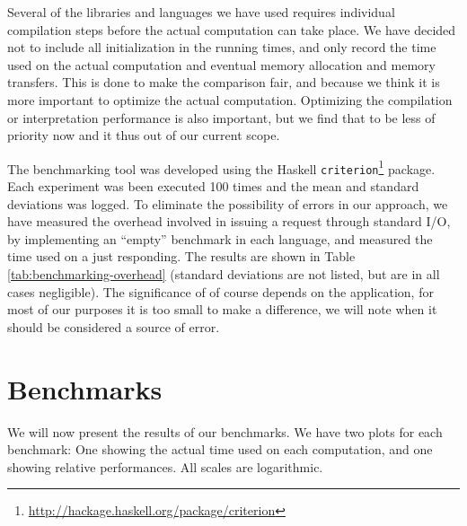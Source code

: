 Several of the libraries and languages we have used requires
individual compilation steps before the actual computation can take
place. We have decided not to include all initialization in the
running times, and only record the time used on the actual computation
and eventual memory allocation and memory transfers. This is done to make the
comparison fair, and because we think it is more important to optimize
the actual computation. Optimizing the compilation or interpretation
performance is also important, but we find that to be less of priority
now and it thus out of our current scope.

The benchmarking tool was developed using the Haskell
\lstinline{criterion}\footnote{\url{http://hackage.haskell.org/package/criterion}}
package. Each experiment was been executed 100 times and the mean and
standard deviations was logged. To eliminate the possibility of errors
in our approach, we have measured the overhead involved in issuing a
request through standard I/O, by implementing an ``empty'' benchmark
in each language, and measured the time used on a just responding. The
results are shown in Table \ref{tab:benchmarking-overhead} (standard
deviations are not listed, but are in all cases negligible). The
significance of of course depends on the application, for most of our
purposes it is too small to make a difference, we will note when it
should be considered a source of error.

\section{Benchmarks}
We will now present the results of our benchmarks. We have two plots
for each benchmark: One showing the actual time used on each
computation, and one showing relative performances. All scales are
logarithmic.

